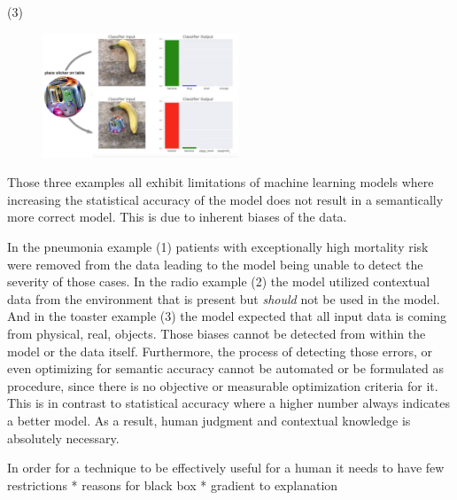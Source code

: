 \par \noindent (3)

\begin{figure}
\centering
\includegraphics[height=10em]{tex/introduction/adversarialtoaster.png}
\caption{
}
\label{figs:toaster}
\end{figure}

Those three examples all exhibit limitations of machine learning models where increasing the statistical accuracy of the model does not result in a semantically more correct model.
This is due to inherent biases of the data.

In the pneumonia example (1) patients with exceptionally high mortality risk were removed from the data leading to the model being unable to detect the severity of those cases.
In the radio example (2) the model utilized contextual data from the environment that is present but \emph{should} not be used in the model.
And in the toaster example (3) the model expected that all input data is coming from physical, real, objects.
Those biases cannot be detected from within the model or the data itself.
Furthermore, the process of detecting those errors, or even optimizing for semantic accuracy cannot be automated or be formulated as procedure, since there is no objective or measurable optimization criteria for it.
This is in contrast to statistical accuracy where a higher number always indicates a better model.
As a result, human judgment and contextual knowledge is absolutely necessary.

In order for a technique to be effectively useful for a human it needs to have few restrictions \todo{}
* reasons for black box
* gradient to explanation